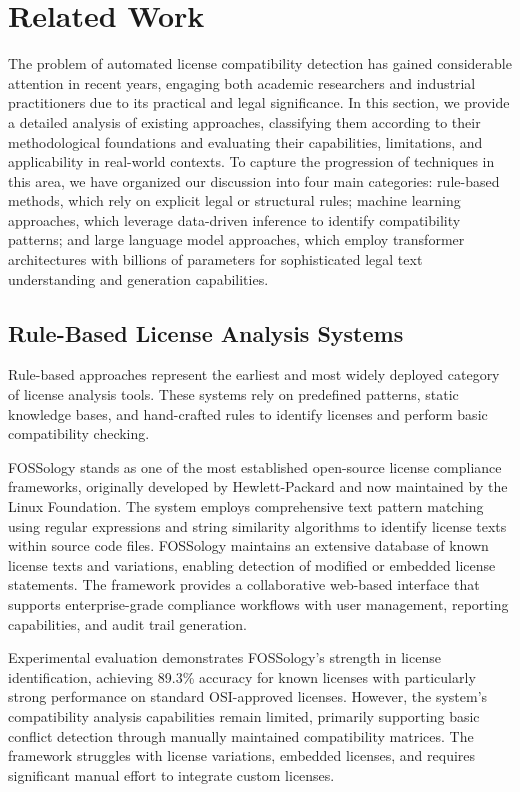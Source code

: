 \section{Related Work}
\label{sec:related}

The problem of automated license compatibility detection has gained considerable attention in recent years, engaging both academic researchers and industrial practitioners due to its practical and legal significance. 
In this section, we provide a detailed analysis of existing approaches, classifying them according to their methodological foundations and evaluating their capabilities, limitations, and applicability in real-world contexts. To capture the progression of techniques in this area, we have organized our discussion into four main categories: rule-based methods, which rely on explicit legal or structural rules; machine learning approaches, which leverage data-driven inference to identify compatibility patterns; and large language model approaches, which employ transformer architectures with billions of parameters for sophisticated legal text understanding and generation capabilities.

\subsection{Rule-Based License Analysis Systems}

Rule-based approaches represent the earliest and most widely deployed category of license analysis tools. These systems rely on predefined patterns, static knowledge bases, and hand-crafted rules to identify licenses and perform basic compatibility checking.


FOSSology \cite{Gobeille08} stands as one of the most established open-source license compliance frameworks, originally developed by Hewlett-Packard and now maintained by the Linux Foundation. The system employs comprehensive text pattern matching using regular expressions and string similarity algorithms to identify license texts within source code files. FOSSology maintains an extensive database of known license texts and variations, enabling detection of modified or embedded license statements. The framework provides a collaborative web-based interface that supports enterprise-grade compliance workflows with user management, reporting capabilities, and audit trail generation.

Experimental evaluation demonstrates FOSSology's strength in license identification, achieving 89.3\% accuracy for known licenses with particularly strong performance on standard OSI-approved licenses. However, the system's compatibility analysis capabilities remain limited, primarily supporting basic conflict detection through manually maintained compatibility matrices. The framework struggles with license variations, embedded licenses, and requires significant manual effort to integrate custom licenses.



